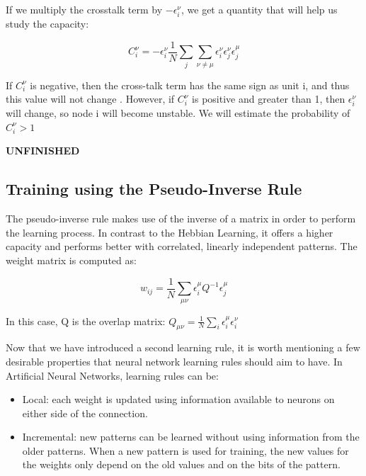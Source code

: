  If we multiply the crosstalk term by \(-\epsilon_{i}^{\nu}\),  we get a quantity that will help us study the capacity:
 
 \[ C_{i}^{\nu}= -\epsilon_{i}^{\nu} \frac{1}{N}\sum_{j} \sum_{\nu\neq\mu} 			 			\epsilon_{i}^{\nu}
		       		 \epsilon_{j}^{\nu}
				 \epsilon_{j}^{\mu}\]
 
 If \( C_{i}^{\nu} \) is negative, then the cross-talk term has the same sign as unit i, and thus this value will not change \cite{lectureslides}. However, if \( C_{i}^{\nu} \) is positive and greater than 1, then \( \epsilon_{i}^{\nu}\) will change, so node i will become unstable. We will estimate the probability of \( C_{i}^{\nu} > 1 \)
 
 \textbf{UNFINISHED}
 
\subsection{Training using the Pseudo-Inverse Rule}

The pseudo-inverse rule makes use of the inverse of a matrix in order to perform the learning process. In contrast to the Hebbian Learning, it offers a higher capacity and performs better with correlated, linearly independent patterns. The weight matrix is computed as:

\[ w_{ij} = \frac{1}{N} \sum_{\mu\nu}\epsilon_{i}^\mu Q^{-1} \epsilon_{j}^\mu \]

In this case, Q is the overlap matrix:
\(  Q_{\mu\nu} = \frac{1}{N}\sum_{i}\epsilon_{i}^\mu \epsilon_{i}^\nu \)

Now that we have introduced a second learning rule, it is worth mentioning a few desirable properties that neural network learning rules should aim to have. In Artificial Neural Networks, learning rules can be:
\begin{itemize}
 \item Local: each weight is updated using information available to neurons on either side of the connection.
 \item Incremental: new patterns can be learned without using information from the older patterns. When a new pattern is used for training, the new values for the weights only depend on the old values and on the bits of the pattern.
\end{itemize}

